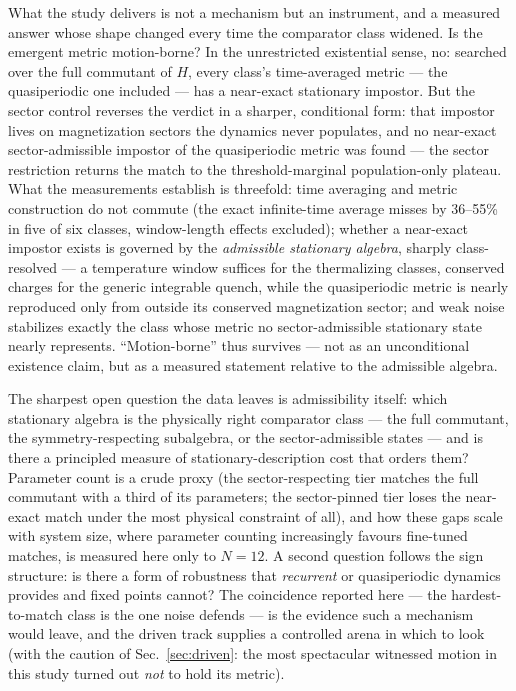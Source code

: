 \documentclass[a4paper,11pt,noarxiv]{quantumarticle}
\begin{document}
What the study delivers is not a mechanism but an instrument, and a
measured answer whose shape changed every time the comparator class
widened. Is the emergent metric motion-borne? In the unrestricted
existential sense, no: searched over the full commutant of $H$, every
class's time-averaged metric --- the quasiperiodic one included ---
has a near-exact stationary impostor. But the sector control
reverses the verdict in a sharper, conditional form: that impostor
lives on magnetization sectors the dynamics never populates, and no
near-exact sector-admissible impostor of the quasiperiodic metric
was found --- the sector restriction returns the match to the
threshold-marginal population-only plateau. What the
measurements establish is threefold: time averaging and metric
construction do not commute (the exact infinite-time average misses
by 36--55\% in five of six classes, window-length effects excluded);
whether a near-exact impostor exists is governed by the
\emph{admissible stationary algebra}, sharply class-resolved --- a
temperature window suffices for the thermalizing classes, conserved
charges for the generic integrable quench, while the quasiperiodic
metric is nearly reproduced only from outside its conserved
magnetization sector; and weak noise stabilizes exactly the class
whose metric no sector-admissible stationary state nearly
represents. ``Motion-borne'' thus survives --- not as an
unconditional existence claim, but as a measured statement relative
to the admissible algebra.

The sharpest open question the data leaves is admissibility itself:
which stationary algebra is the physically right comparator class ---
the full commutant, the symmetry-respecting subalgebra, or the
sector-admissible states --- and is there a principled measure
of stationary-description cost that orders them? Parameter count is
a crude proxy (the sector-respecting tier matches the full commutant
with a third of its parameters; the sector-pinned tier loses the
near-exact match under the most physical constraint of all), and how
these gaps scale with
system size, where parameter counting increasingly favours
fine-tuned matches, is measured here only to $N = 12$. A second question follows the sign structure: is
there a form of robustness that \emph{recurrent} or quasiperiodic
dynamics provides and fixed points cannot? The coincidence reported
here --- the hardest-to-match class is the one noise defends --- is
the evidence such a mechanism would leave, and the driven track
supplies a controlled arena in which to look (with the caution of
Sec.~\ref{sec:driven}: the most spectacular witnessed motion in this
study turned out \emph{not} to hold its metric).
\end{document}

